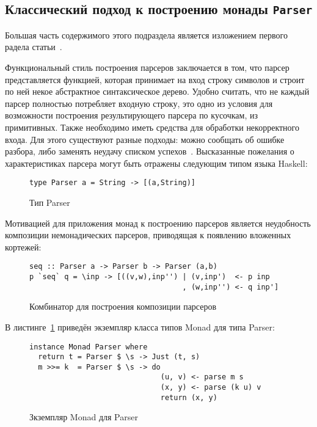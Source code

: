 \subsection{Классический подход к построению монады \lstinline{Parser}}

Большая часть содержимого этого подраздела является изложением первого радела статьи~\autocite{MonParsing}.

Функциональный стиль построения парсеров заключается в том, что парсер представляется функцией, которая принимает на вход строку символов и строит по ней некое абстрактное синтаксическое дерево. Удобно считать, что не каждый парсер полностью потребляет входную строку, это одно из условия для возможности построения результирующего парсера по кусочкам, из примитивных. Также необходимо иметь средства для обработки некорректного входа. Для этого существуют разные подходы: можно сообщать об ошибке разбора, либо заменять неудачу списком успехов~\autocite{WadlerSuccess}. Высказанные пожелания о характеристиках парсера могут быть отражены следующим типом языка Haskell: 

\begin{figure}[h]
\begin{lstlisting}
type Parser a = String -> [(a,String)]
\end{lstlisting}
\caption{Тип Parser}
\end{figure}

Мотивацией для приложения монад к построению парсеров является неудобность композиции немонадических парсеров, приводящая к появлению вложенных кортежей: 

\begin{figure}[h]
\begin{lstlisting}
seq :: Parser a -> Parser b -> Parser (a,b)
p `seq` q = \inp -> [((v,w),inp'') | (v,inp')  <- p inp
                                   , (w,inp'') <- q inp']
\end{lstlisting}
\caption{Комбинатор для построения композиции парсеров}
\end{figure}

В листинге~\ref{listing:MonadParser} приведён экземпляр класса типов Monad для типа Parser: 

\begin{figure}[t]
  \begin{lstlisting}
instance Monad Parser where
  return t = Parser $ \s -> Just (t, s)
  m >>= k  = Parser $ \s -> do 
                              (u, v) <- parse m s
                              (x, y) <- parse (k u) v
                              return (x, y)
  \end{lstlisting}
  \caption{Зкземпляр Monad для Parser}
  \label{listing:MonadParser}
\end{figure}

